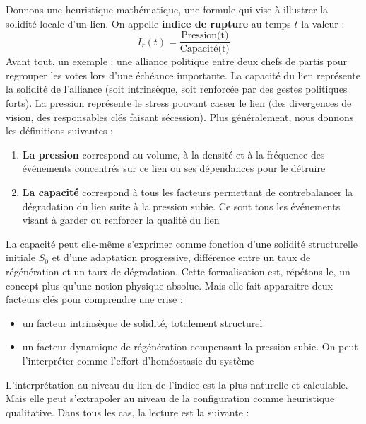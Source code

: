 \documentclass{report}
\begin{document}
	Donnons une heuristique mathématique, une formule qui vise à illustrer la solidité locale d'un lien. On appelle \textbf{indice de rupture} au temps $t$ la valeur : 
	$$\displaystyle{I_r(t) = \frac{\text{Pression(t)}}{\text{Capacité(t)}}}$$
	Avant tout, un exemple : une alliance politique entre deux chefs de partis pour regrouper les votes lors d'une échéance importante. La capacité du lien représente la solidité de l'alliance (soit intrinsèque, soit renforcée par des gestes politiques forts). La pression représente le stress pouvant casser le lien (des divergences de vision, des responsables clés faisant sécession). Plus généralement, nous donnons les définitions suivantes : 
	\begin{enumerate}
		\item \textbf{La pression} correspond au volume, à la densité et à la fréquence des événements concentrés sur ce lien ou ses dépendances pour le détruire
		\item \textbf{La capacité} correspond à tous les facteurs permettant de contrebalancer la dégradation du lien suite à la pression subie. Ce sont tous les événements visant à garder ou renforcer la qualité du lien
	\end{enumerate}
	
	La capacité peut elle-même s'exprimer comme fonction d'une solidité structurelle initiale $S_0$ et d'une adaptation progressive, différence entre un taux de régénération et un taux de dégradation. Cette formalisation est, répétons le, un concept plus qu'une notion physique absolue. Mais elle fait apparaitre deux facteurs clés pour comprendre une crise : 
	\begin{itemize}
		\item un facteur intrinsèque de solidité, totalement structurel
		\item un facteur dynamique de régénération compensant la pression subie. On peut l'interpréter comme l'effort d'homéostasie du système
	\end{itemize}
	
	
	L'interprétation au niveau du lien de l'indice est la plus naturelle et calculable. Mais elle peut s'extrapoler au niveau de la configuration comme heuristique qualitative. Dans tous les cas, la lecture est la suivante : 
	
\end{document}
